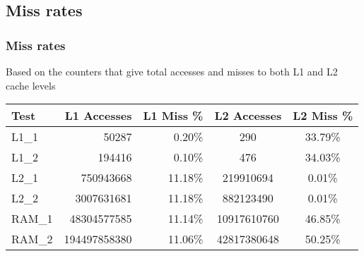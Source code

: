 \documentclass{beamer}
\begin{document}
\subsection{Miss rates}
\begin{frame}
	\frametitle{Miss rates}%

	Based on the counters that give total accesses and misses to both L1 and L2 cache levels

	\begin{table}[!htp]
		\begin{center}
		{\small
			\begin{tabular}{|l|r|r|c|c|}

				\hline
				Test	&	L1 Accesses		&	L1 Miss \%	&	L2 Accesses		&	L2 Miss \%	\\
				\hline
				L1\_1	&	50287			&	0.20\%		&	290				&	33.79\%		\\
				L1\_2	&	194416			&	0.10\%		&	476				&	34.03\%		\\
				L2\_1	&	750943668		&	11.18\%		&	219910694		&	0.01\%		\\
				L2\_2	&	3007631681		&	11.18\%		&	882123490		&	0.01\%		\\
				RAM\_1	&	48304577585		&	11.14\%		&	10917610760		&	46.85\%		\\
				RAM\_2	&	194497858380	&	11.06\%		&	42817380648		&	50.25\%		\\
				\hline
			\end{tabular}
		}
		\end{center}
	\end{table}
\end{frame}
\end{document}
